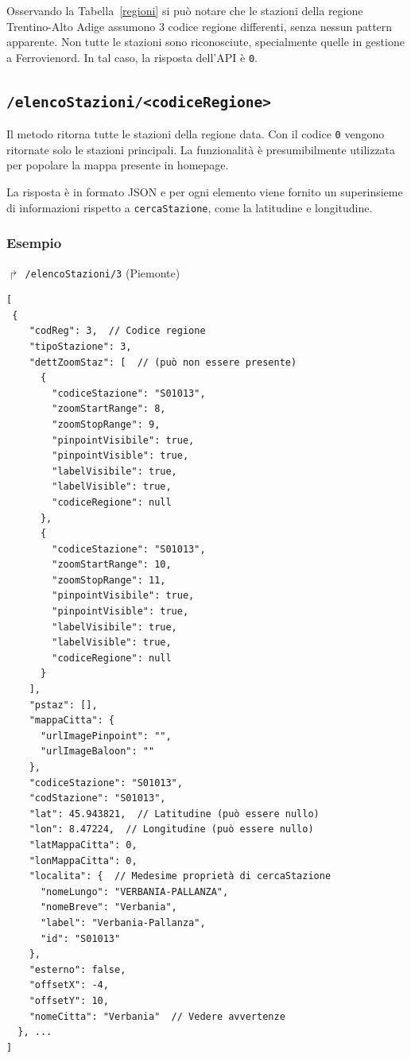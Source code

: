 \documentclass[12pt,italian]{report}
\begin{document}
Osservando la Tabella~\ref{regioni} si può notare che le stazioni
della regione Trentino-Alto Adige assumono 3 codice regione
differenti, senza nessun pattern apparente.  Non tutte le stazioni
sono riconosciute, specialmente quelle in gestione a Ferrovienord.  In
tal caso, la risposta dell'API è \texttt{0}.

\subsection{\texttt{/elencoStazioni/<codiceRegione>}}
\label{elencoStazioni}

Il metodo ritorna tutte le stazioni della regione data.  Con il codice
\texttt{0} vengono ritornate solo le stazioni principali.  La
funzionalità è presumibilmente utilizzata per popolare la mappa
presente in homepage.

La risposta è in formato JSON e per ogni elemento viene fornito un
superinsieme di informazioni rispetto a \texttt{cercaStazione}, come
la latitudine e longitudine.

\subsubsection{Esempio}

$\Rsh$ \texttt{/elencoStazioni/3} \hfill (Piemonte)
\begin{verbatim}
[
 {
    "codReg": 3,  // Codice regione
    "tipoStazione": 3,
    "dettZoomStaz": [  // (può non essere presente)
      {
        "codiceStazione": "S01013",
        "zoomStartRange": 8,
        "zoomStopRange": 9,
        "pinpointVisibile": true,
        "pinpointVisible": true,
        "labelVisibile": true,
        "labelVisible": true,
        "codiceRegione": null
      },
      {
        "codiceStazione": "S01013",
        "zoomStartRange": 10,
        "zoomStopRange": 11,
        "pinpointVisibile": true,
        "pinpointVisible": true,
        "labelVisibile": true,
        "labelVisible": true,
        "codiceRegione": null
      }
    ],
    "pstaz": [],
    "mappaCitta": {
      "urlImagePinpoint": "",
      "urlImageBaloon": ""
    },
    "codiceStazione": "S01013",
    "codStazione": "S01013",
    "lat": 45.943821,  // Latitudine (può essere nullo)
    "lon": 8.47224,  // Longitudine (può essere nullo)
    "latMappaCitta": 0,
    "lonMappaCitta": 0,
    "localita": {  // Medesime proprietà di cercaStazione
      "nomeLungo": "VERBANIA-PALLANZA",
      "nomeBreve": "Verbania",
      "label": "Verbania-Pallanza",
      "id": "S01013"
    },
    "esterno": false,
    "offsetX": -4,
    "offsetY": 10,
    "nomeCitta": "Verbania"  // Vedere avvertenze
  }, ...
]
\end{verbatim}
\end{document}
